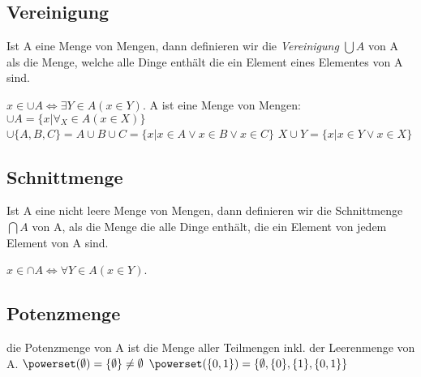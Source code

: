 \subsection{Vereinigung}
Ist A eine Menge von Mengen, dann definieren wir die \emph{Vereinigung} \( \bigcup A\) von A als die Menge, welche alle Dinge enthält die ein Element eines Elementes von A sind.
\par \hspace*{10mm} \( x \in \cup A \Leftrightarrow \exists Y \in A(x \in Y) \).
\newline A ist eine Menge von Mengen: \newline
\hspace*{10mm}\( \cup A = \{x | \forall_X \in A (x \in X)\}\) \newline
\hspace*{10mm}\( \cup \{A, B, C\} = A \cup B \cup C = \{x|x \in A \vee x \in B \vee x \in C\}\) \newline
\hspace*{10mm}\( X \cup Y = \{ x | x \in Y \vee x \in X \}\)
\subsection{Schnittmenge}
Ist A eine nicht leere Menge von Mengen, dann definieren wir die Schnittmenge \(\bigcap A\) von A, als die Menge die alle Dinge enthält, die ein Element von jedem Element von A sind.
\par \hspace*{10mm} \( x \in \cap A \Leftrightarrow \forall Y \in A(x \in Y) \).
\subsection{Potenzmenge}
die Potenzmenge von A ist die Menge aller Teilmengen inkl. der Leerenmenge von A. \newline
\( \powerset(\emptyset) = \{\emptyset\} \neq \emptyset \) \newline
\( \powerset(\{0, 1\}) = \{\emptyset, \{0\}, \{1\}, \{0,1\}\} \)